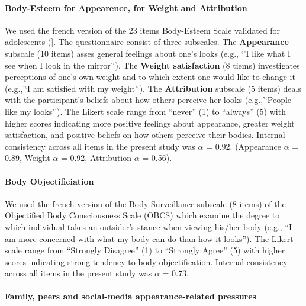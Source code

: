 \documentclass[preprint, 3p,
authoryear]{elsarticle} %
\begin{document}
\hypertarget{body-esteem-for-appearence-for-weight-and-attribution}{%
\paragraph{Body-Esteem for Appearence, for Weight and
Attribution}\label{body-esteem-for-appearence-for-weight-and-attribution}}

We used the french version \citep{valls_etude_2011} of the 23 items
Body-Esteem Scale validated for adolescents
(\citet{mendelson_body-esteem_2001}{]}. The questionnaire consist of
three subscales. The \textbf{Appearance} subscale (10 items) asses
general feelings about one's looks (e.g., `'I like what I see when I
look in the mirror'`). The \textbf{Weight satisfaction} (8 tiems)
investigates perceptions of one's own weight and to which extent one
would like to change it (e.g.,'`I am satisfied with my weight'`). The
\textbf{Attribution} subscale (5 items) deals with the participant's
beliefs about how others perceive her looks (e.g.,'`People like my
looks''). The Likert scale range from ``never'' (1) to ``always'' (5)
with higher scores indicating more positive feelings about appearance,
greater weight satisfaction, and positive beliefs on how others perceive
their bodies. Internal consistency across all items in the present study
was \(\alpha\) = 0.92. (Appearance \(\alpha\) = 0.89, Weight \(\alpha\)
= 0.92, Attribution \(\alpha\) = 0.56).

\hypertarget{body-objectificiation}{%
\paragraph{Body Objectificiation}\label{body-objectificiation}}

We used the french version \citep{wollast_how_2019} of the Body
Surveillance subscale (8 items) of the Objectified Body Consciousness
Scale (OBCS)\citep{mckinley_objectified_1996} which examine the degree
to which individual takes an outsider's stance when viewing his/her body
(e.g., ``I am more concerned with what my body can do than how it
looks''). The Likert scale range from ``Strongly Disagree'' (1) to
``Strongly Agree'' (5) with higher scores indicating strong tendency to
body objectification. Internal consistency across all items in the
present study was \(\alpha\) = 0.73.

\hypertarget{family-peers-and-social-media-appearance-related-pressures}{%
\paragraph{Family, peers and social-media appearance-related
pressures}\label{family-peers-and-social-media-appearance-related-pressures}}
\end{document}

